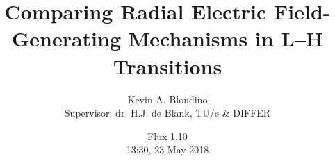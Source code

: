 \documentclass[12pt,a4paper]{article}
\title{Comparing Radial Electric Field-Generating Mechanisms in L--H Transitions}
\author{Kevin A. Blondino \\ Supervisor: dr. H.J. de Blank, TU/e \& DIFFER}
\date{Flux 1.10 \\ \vspace*{5mm} 13:30, 23 May 2018}
\begin{document}
\maketitle

\begin{abstract}
	
\end{abstract}
\end{document}
